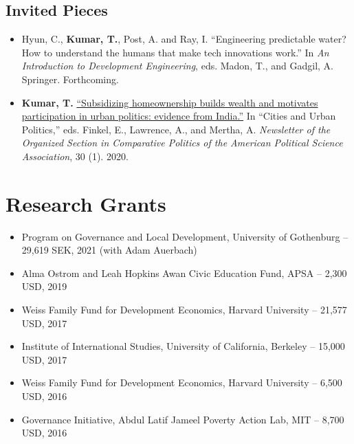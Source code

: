 \documentclass[11pt]{article}
\begin{document}
\subsection*{Invited Pieces}
\begin{itemize}
	\item[]Hyun, C., \textbf{Kumar, T.}, Post, A. and Ray, I. ``Engineering predictable water? How to understand the humans that make tech innovations work.'' In \textit{An Introduction to Development Engineering}, eds. Madon, T., and Gadgil, A. Springer. Forthcoming.

\item[]\textbf{Kumar, T.} \href{https://www.comparativepoliticsnewsletter.org/wp-content/uploads/2020/05/Spring-Newsletter-2020.pdf}{``Subsidizing homeownership builds wealth and motivates participation in urban politics: evidence from India.''}  In ``Cities and Urban Politics,'' eds. Finkel, E.,  Lawrence, A.,  and Mertha, A.  \textit{Newsletter of the Organized Section in Comparative Politics of the American Political Science Association}, 30 (1). 2020.
	\end{itemize}
	



\vspace{2mm}
\section*{Research Grants}

\begin{itemize}[nosep]

\item[] Program on Governance and Local Development, University of Gothenburg -- 29,619 SEK, 2021 (with Adam Auerbach)
\item[] Alma Ostrom and Leah Hopkins Awan Civic Education Fund, APSA -- 2,300 USD, 2019

\item[] Weiss Family Fund for Development Economics, Harvard University -- 21,577 USD, 2017


	 
\item[]Institute of International Studies, University of California, Berkeley -- 15,000 USD, 2017
\item[] Weiss Family Fund for Development Economics, Harvard University -- 6,500 USD, 2016 

\item[] Governance Initiative, Abdul Latif Jameel Poverty Action Lab, MIT -- 8,700 USD, 2016	
\end{itemize}
\end{document}
